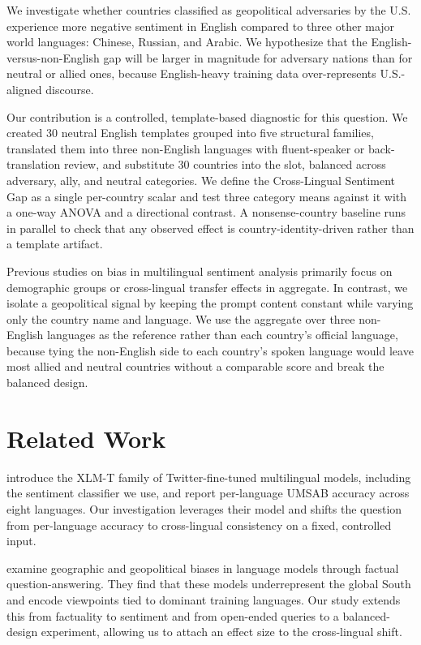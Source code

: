 \documentclass[11pt]{article}
\begin{document}
We investigate whether countries classified as geopolitical adversaries by the U.S. experience more negative sentiment in English compared to three other major world languages: Chinese, Russian, and Arabic. We hypothesize that the English-versus-non-English gap will be larger in magnitude for adversary nations than for neutral or allied ones, because English-heavy training data over-represents U.S.-aligned discourse.

Our contribution is a controlled, template-based diagnostic for this question. We created 30 neutral English templates grouped into five structural families, translated them into three non-English languages with fluent-speaker or back-translation review, and substitute 30 countries into the slot, balanced across adversary, ally, and neutral categories. We define the Cross-Lingual Sentiment Gap as a single per-country scalar and test three category means against it with a one-way ANOVA and a directional contrast. A nonsense-country baseline runs in parallel to check that any observed effect is country-identity-driven rather than a template artifact.

Previous studies on bias in multilingual sentiment analysis primarily focus on demographic groups or cross-lingual transfer effects in aggregate. In contrast, we isolate a geopolitical signal by keeping the prompt content constant while varying only the country name and language. We use the aggregate over three non-English languages as the reference rather than each country's official language, because tying the non-English side to each country's spoken language would leave most allied and neutral countries without a comparable score and break the balanced design.

\section{Related Work}

\citet{barbieri-etal-2022-xlm} introduce the XLM-T family of Twitter-fine-tuned multilingual models, including the sentiment classifier we use, and report per-language UMSAB accuracy across eight languages. Our investigation leverages their model and shifts the question from per-language accuracy to cross-lingual consistency on a fixed, controlled input.

\citet{faisal-anastasopoulos-2023-geographic} examine geographic and geopolitical biases in language models through factual question-answering. They find that these models underrepresent the global South and encode viewpoints tied to dominant training languages. Our study extends this from factuality to sentiment and from open-ended queries to a balanced-design experiment, allowing us to attach an effect size to the cross-lingual shift.
\end{document}
